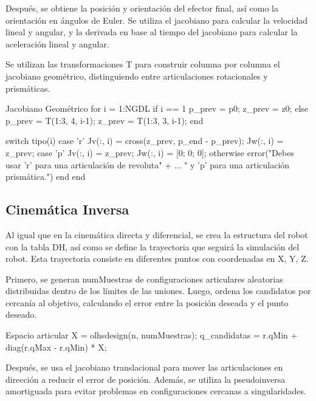 Después, se obtiene la posición y orientación del efector final, así como la orientación en ángulos de Euler. Se utiliza el jacobiano para calcular la velocidad lineal y angular, y la derivada en base al tiempo del jacobiano para calcular la aceleración lineal y angular. 

Se utilizan las transformaciones T para construir columna por columna el jacobiano geométrico, distinguiendo entre articulaciones rotacionales y prismáticas.

\begin{matlabcode}{Jacobiano Geométrico}
	for i = 1:NGDL
        if i == 1
            p_prev = p0;
            z_prev = z0;
        else
            p_prev = T(1:3, 4, i-1);    %
            z_prev = T(1:3, 3, i-1);    %
        end

        switch tipo(i)
            case 'r'
                Jv(:, i) = cross(z_prev, p_end - p_prev);
                Jw(:, i) = z_prev;
            case 'p'
                Jv(:, i) = z_prev;
                Jw(:, i) = [0; 0; 0];
            otherwise
                error("Debes usar 'r' para una articulación de revoluta" + ...
                  " y 'p' para una articulación prismática.")
        end
    end

\end{matlabcode}

\subsection{Cinemática Inversa}

Al igual que en la cinemática directa y diferencial, se crea la estructura del robot con la tabla DH, así como se define la trayectoria que seguirá la simulación del robot. Esta trayectoria consiste en diferentes puntos con coordenadas en X, Y, Z. 

Primero, se generan numMuestras de configuraciones articulares aleatorias distribuidas dentro de los límites de las uniones. Luego, ordena los candidatos por cercanía al objetivo, calculando el error entre la posición deseada y el punto deseado.  

\begin{matlabcode}{Espacio articular}
	X = olhsdesign(n, numMuestras); 
    q_candidatas = r.qMin + diag(r.qMax - r.qMin) * X;
\end{matlabcode}

Después, se usa el jacobiano translacional para mover las articulaciones en dirección a reducir el error de posición. Además, se utiliza la pseudoinversa amortiguada para evitar problemas en configuraciones cercanas a singularidades. 

